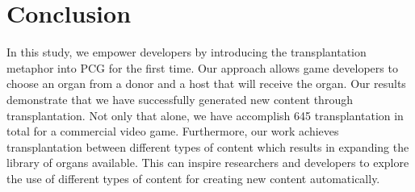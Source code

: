 \section{Conclusion}
\label{sec:Conclusion}





In this study, we empower developers by introducing the transplantation metaphor into PCG for the first time. Our approach allows game developers to choose an organ from a donor and a host that will receive the organ.
Our results demonstrate that we have successfully generated new content through transplantation. Not only that alone, we have accomplish 645 transplantation in total for a commercial video game. Furthermore, our work achieves transplantation between different types of content which results in expanding the library of organs available. This can inspire researchers and developers to explore the use of different types of content for creating new content automatically. 


